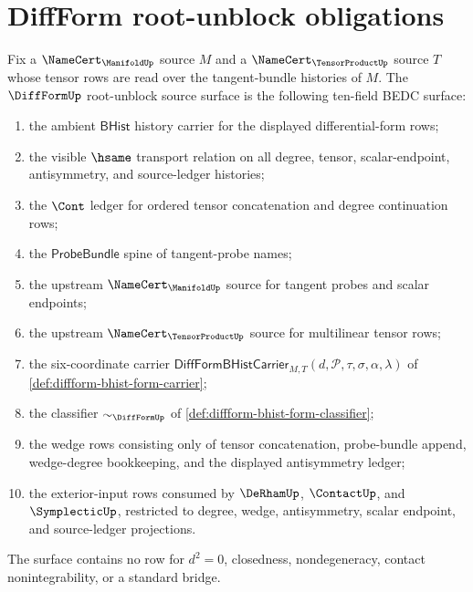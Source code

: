 \section{DiffForm root-unblock obligations}
\label{sec:diffform-root-unblock-obligations}

\begin{definition}
\label{def:diffform-root-unblock-source-surface}
Fix a $\NameCert_{\ManifoldUp}$ source $M$ and a
$\NameCert_{\TensorProductUp}$ source $T$ whose tensor rows are read over the
tangent-bundle histories of $M$. The $\DiffFormUp$ root-unblock source surface
is the following ten-field BEDC surface:
\begin{enumerate}
  \item the ambient $\mathsf{BHist}$ history carrier for the displayed
  differential-form rows;
  \item the visible $\hsame$ transport relation on all degree, tensor,
  scalar-endpoint, antisymmetry, and source-ledger histories;
  \item the $\Cont$ ledger for ordered tensor concatenation and degree
  continuation rows;
  \item the $\mathsf{ProbeBundle}$ spine of tangent-probe names;
  \item the upstream $\NameCert_{\ManifoldUp}$ source for tangent probes and
  scalar endpoints;
  \item the upstream $\NameCert_{\TensorProductUp}$ source for multilinear
  tensor rows;
  \item the six-coordinate carrier
  $\mathsf{DiffFormBHistCarrier}_{M,T}(d,\mathcal{P},\tau,\sigma,\alpha,\lambda)$
  of \autoref{def:diffform-bhist-form-carrier};
  \item the classifier $\sim_{\DiffFormUp}$ of
  \autoref{def:diffform-bhist-form-classifier};
  \item the wedge rows consisting only of tensor concatenation, probe-bundle
  append, wedge-degree bookkeeping, and the displayed antisymmetry ledger;
  \item the exterior-input rows consumed by $\DeRhamUp$, $\ContactUp$, and
  $\SymplecticUp$, restricted to degree, wedge, antisymmetry, scalar endpoint,
  and source-ledger projections.
\end{enumerate}
The surface contains no row for $d^2=0$, closedness, nondegeneracy, contact
nonintegrability, or a standard bridge.
\end{definition}

